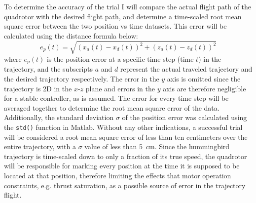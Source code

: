 \documentclass[onecolumn,10pt]{IEEEtran}
\newcommand{\MATLAB}{Matlab}
\begin{document}
To determine the accuracy of the trial I will compare the actual flight path of the quadrotor with the desired flight path, and determine a time-scaled root mean square error between the two position vs time datasets. This error will be calculated using the distance formula  below:
\begin{equation}
e_p(t) = \sqrt{(x_a(t)-x_d(t))^2 + (z_a(t)-z_d(t))^2}
\label{eq:demonstration-1}
\end{equation}
where $e_p(t)$ is the position error at a specific time step (time $t$) in the trajectory, and the subscripts $a$ and $d$ represent the actual traveled trajectory and the desired trajectory respectively. The error in the $y$ axis is omitted since the trajectory is 2D in the $x$-$z$ plane and errors in the $y$ axis are therefore negligible for a stable controller, as is assumed. The error for every time step will be averaged together to determine the root mean square error of the data. Additionally, the standard deviation $\sigma$ of the position error was calculated using the \lstinline{std()} function in \MATLAB. Without any other indications, a successful trial will be considered a root mean square error of less than ten centimeters over the entire trajectory, with a $\sigma$ value of less than \SI{5}{\centi\meter}. Since the hummingbird trajectory is time-scaled down to only a fraction of its true speed, the quadrotor will be responsible for marking every position at the time it is supposed to be located at that position, therefore limiting the effects that motor operation constraints, e.g. thrust saturation, as a possible source of error in the trajectory flight.
\end{document}
